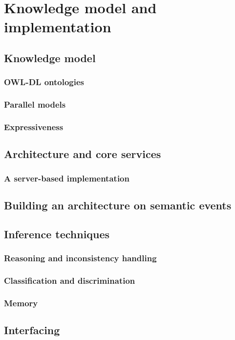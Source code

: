 \chapter{Knowledge model and implementation}
\label{chapter|implementation}

\section{Knowledge model}
\label{sect|knowledge-model}

\subsection{OWL-DL ontologies}
\label{sect|owldl-ontologies}

\subsection{Parallel models}
\label{sect|parallel-models}

\subsection{Expressiveness}
\label{sect|expressiveness}

\section{ Architecture and core services}
\label{sect|oro-core}

\subsection{A server-based implementation}
\label{sect|oro-serverbased}

\section{Building an architecture on semantic events}
\label{sect|events}

\section{Inference techniques}
\label{sect|inference-techniques}

\subsection{Reasoning and inconsistency handling}
\label{sect|reasoning}

\subsection{Classification and discrimination}
\label{subssect|discrimination}

\subsection{Memory}
\label{subssect|memory}

\section{Interfacing}
\label{sect|interfacing}
